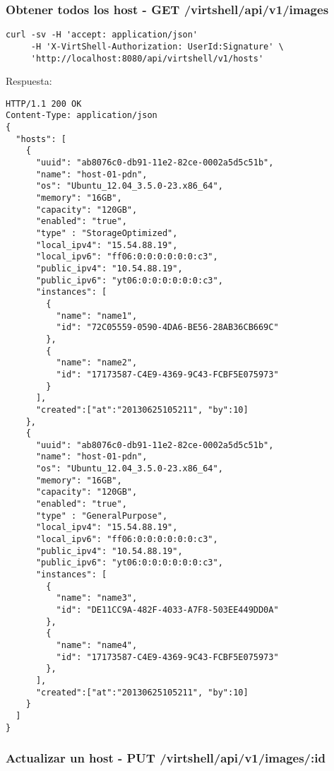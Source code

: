 \subsubsection{Obtener todos los host - GET /virtshell/api/v1/images}

\begin{lstlisting}[style=json]
curl -sv -H 'accept: application/json' 
     -H 'X-VirtShell-Authorization: UserId:Signature' \ 
     'http://localhost:8080/api/virtshell/v1/hosts'
\end{lstlisting}

\vspace{1cm}
Respuesta:
\vspace{1cm}

\begin{lstlisting}[style=json]
HTTP/1.1 200 OK
Content-Type: application/json
{
  "hosts": [
    {
      "uuid": "ab8076c0-db91-11e2-82ce-0002a5d5c51b",
      "name": "host-01-pdn",
      "os": "Ubuntu_12.04_3.5.0-23.x86_64",
      "memory": "16GB",
      "capacity": "120GB",
      "enabled": "true",
      "type" : "StorageOptimized",
      "local_ipv4": "15.54.88.19",
      "local_ipv6": "ff06:0:0:0:0:0:0:c3",
      "public_ipv4": "10.54.88.19",
      "public_ipv6": "yt06:0:0:0:0:0:0:c3",
      "instances": [
        {
          "name": "name1",
          "id": "72C05559-0590-4DA6-BE56-28AB36CB669C"
        },
        {
          "name": "name2",
          "id": "17173587-C4E9-4369-9C43-FCBF5E075973"
        }
      ],
      "created":["at":"20130625105211", "by":10]
    },
    {
      "uuid": "ab8076c0-db91-11e2-82ce-0002a5d5c51b",
      "name": "host-01-pdn",
      "os": "Ubuntu_12.04_3.5.0-23.x86_64",
      "memory": "16GB",
      "capacity": "120GB",
      "enabled": "true",
      "type" : "GeneralPurpose",
      "local_ipv4": "15.54.88.19",
      "local_ipv6": "ff06:0:0:0:0:0:0:c3",
      "public_ipv4": "10.54.88.19",
      "public_ipv6": "yt06:0:0:0:0:0:0:c3",
      "instances": [
        {
          "name": "name3",
          "id": "DE11CC9A-482F-4033-A7F8-503EE449DD0A"
        },
        {
          "name": "name4",
          "id": "17173587-C4E9-4369-9C43-FCBF5E075973"
        },    
      ],
      "created":["at":"20130625105211", "by":10]
    }
  ]
}   
\end{lstlisting}

\subsubsection{Actualizar un host - PUT /virtshell/api/v1/images/:id}

